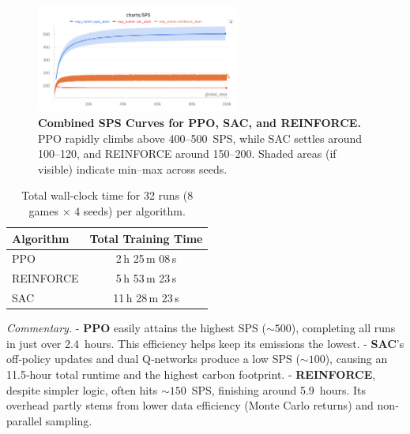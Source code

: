 \begin{figure}[htbp]
	\centering
	\includegraphics[width=0.6\textwidth]{figures/policy_comparison/policy_sps_comparison.png}
	\caption{\textbf{Combined SPS Curves for PPO, SAC, and REINFORCE.}
		PPO rapidly climbs above 400--500~SPS, while SAC settles around 100--120, and REINFORCE around 150--200. 
		Shaded areas (if visible) indicate min--max across seeds.}
	\label{fig:policy_sps_comparison}
\end{figure}

\begin{table}[htbp]
	\centering
	\caption{Total wall‐clock time for 32 runs (8 games × 4 seeds) per algorithm.}
	\label{tab:policy_training_time}
	\begin{tabular}{lc}
		\toprule
		\textbf{Algorithm} & \textbf{Total Training Time}\\
		\midrule
		PPO         & 2\,h 25\,m 08\,s \\
		REINFORCE   & 5\,h 53\,m 23\,s \\
		SAC         & 11\,h 28\,m 23\,s \\
		\bottomrule
	\end{tabular}
\end{table}

\noindent
\emph{Commentary.}
- \textbf{PPO} easily attains the highest SPS ($\sim500$), completing all runs in just over 2.4~hours. This efficiency helps keep its emissions the lowest.  
- \textbf{SAC}’s off‐policy updates and dual Q‐networks produce a low SPS ($\sim100$), causing an 11.5‐hour total runtime and the highest carbon footprint.  
- \textbf{REINFORCE}, despite simpler logic, often hits \(\sim150\)~SPS, finishing around 5.9~hours. Its overhead partly stems from lower data efficiency (Monte Carlo returns) and non‐parallel sampling.

